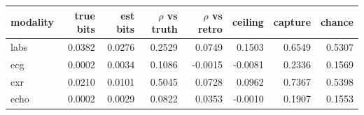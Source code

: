 \begin{tabular}{lrrrrrrr}
\toprule
\textbf{modality} & \textbf{true bits} & \textbf{est bits} & \textbf{$\rho$ vs truth} & \textbf{$\rho$ vs retro} & \textbf{ceiling} & \textbf{capture} & \textbf{chance} \\
\midrule
labs & 0.0382 & 0.0276 & 0.2529 & 0.0749 & 0.1503 & 0.6549 & 0.5307 \\
ecg & 0.0002 & 0.0034 & 0.1086 & -0.0015 & -0.0081 & 0.2336 & 0.1569 \\
cxr & 0.0210 & 0.0101 & 0.5045 & 0.0728 & 0.0962 & 0.7367 & 0.5398 \\
echo & 0.0002 & 0.0029 & 0.0822 & 0.0353 & -0.0010 & 0.1907 & 0.1553 \\
\bottomrule
\end{tabular}
